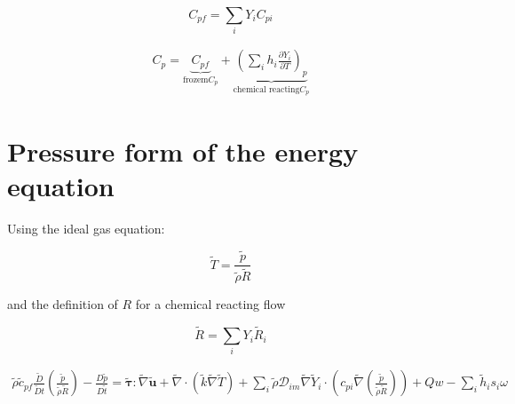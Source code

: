 \documentclass[preprint,12pt,authoryear]{elsarticle}
\begin{document}
\begin{equation}
C_{pf}=\sum_iY_iC_{pi}
\end{equation}

\begin{equation}
\begin{split}
C_p
=
\underbrace{
C_{pf}
	    }_{\text{frozem}C_p}
+
\underbrace{
		\left(\sum_i h_i\frac{\partial{Y_i}}{\partial{T}}\right)_p
}_{\text{chemical reacting} C_p}
\end{split}
\end{equation}


\section{Pressure form of the energy equation}


Using the ideal gas equation:

\begin{equation}
        \tilde{T}=\frac{\tilde{p}}{\tilde{\rho}\tilde{R}}
\end{equation}

and the definition of $R$ for a chemical reacting flow 

\begin{equation}
	\tilde{R}=\sum_iY_i\tilde{R}_i
\end{equation}

\begin{equation}
\begin{split}
        \tilde{\rho}
        \tilde{c}_{pf}
        \frac{\tilde{D}}{\tilde{D} t}
        \left(
                \frac{\tilde{p}}{\tilde{\rho}\tilde{R}}
        \right)
        -
        \frac{D \tilde{p}}{D\tilde{t}}
        =
        \pmb{\tilde{\tau}}:\tilde{\nabla} \tilde{\mathbf{u}} 
        + 
        \tilde{\nabla} \cdot (\tilde{k}\tilde{\nabla} \tilde{T})
        +
        \sum\limits_i 
        \tilde{\rho}
        \mathcal{D}_{im}
        \tilde{\nabla}
        \tilde{Y}_i     
        \cdot
        \left(
                c_{pi}
                \tilde{\nabla}
                \left(
                	\frac{\tilde{p}}{\tilde{\rho}\tilde{R}}
        	\right)
        \right)
	+
	Qw
	-
        \sum\limits_i
	\tilde{h}_i
        s_i \omega	
\end{split}
\end{equation}
\end{document}
